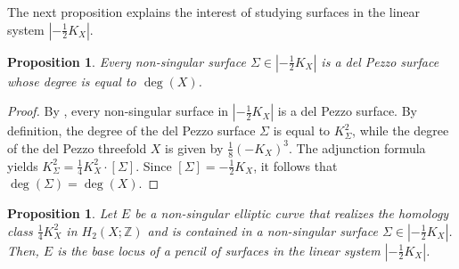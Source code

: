 \documentclass[11pt]{amsart}
\numberwithin{equation}{section}
\theoremstyle{definition}
\theoremstyle{plain}
\newtheorem{proposition}[definition]{Proposition}
\theoremstyle{remark}
\begin{document}
 

The next proposition explains the interest of studying surfaces in the linear system $|-\frac{1}{2}K_X|$.

\begin{proposition}\label{Prop-delPezzo.surfaces}
Every non-singular surface $\Sigma\in |-\frac{1}{2}K_X|$ is a del Pezzo surface whose degree is equal to $\deg(X)$.
\end{proposition}

\begin{proof}
  By \cite[Corollary 1.11]{iskovskikh1977fano}, every non-singular surface in $ |-\frac{1}{2}K_X|$  is a del Pezzo surface. By definition, the degree of the del Pezzo surface $\Sigma$ is equal to $K_\Sigma^2$, while the degree of the del Pezzo threefold $X$ is given by $\frac{1}{8}(-K_X)^3$. The adjunction formula yields $K_{\Sigma}^2 = \frac{1}{4}K_X^2 \cdot [\Sigma]$. Since $[\Sigma] = -\frac{1}{2}K_X$, it follows that $\deg(\Sigma) = \deg(X)$.
\end{proof}

\begin{proposition} \label{prop-elliptic.implies.pencil}
Let $E$ be a non-singular elliptic curve that realizes the homology class $\frac{1}{4}K^2_X$ in $H_2(X;\mathbb{Z})$ and is contained in a non-singular surface $\Sigma\in |-\frac{1}{2}K_X|$. Then, $E$ is the base locus of a pencil of surfaces in the linear system $|-\frac{1}{2}K_X|$.
\end{proposition}
\end{document}
